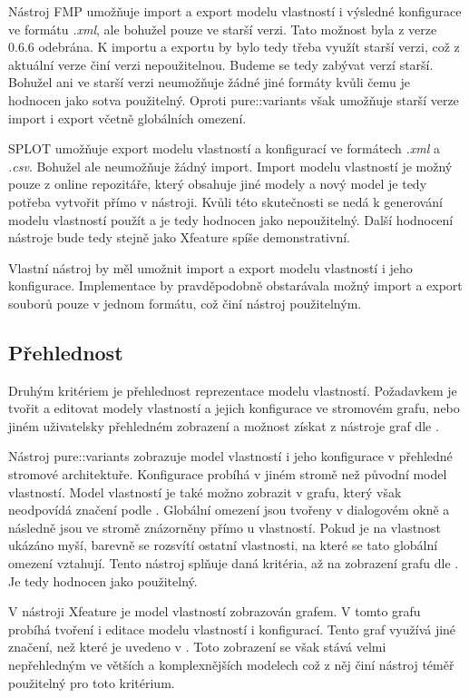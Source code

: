 Nástroj FMP umožňuje import a export modelu vlastností i výsledné konfigurace ve formátu \textit{.xml}, ale bohužel pouze ve starší verzi. Tato možnost byla z verze 0.6.6 odebrána. K importu a exportu by bylo tedy třeba využít starší verzi, což z aktuální verze činí verzi nepoužitelnou. Budeme se tedy zabývat verzí starší. Bohužel ani ve starší verzi neumožňuje žádné jiné formáty kvůli čemu je hodnocen jako sotva použitelný. Oproti pure::variants však umožňuje starší verze import i export včetně globálních omezení. 

SPLOT umožňuje export modelu vlastností a konfigurací ve formátech \textit{.xml} a \textit{.csv}. Bohužel ale neumožňuje žádný import. Import modelu vlastností je možný pouze z online repozitáře, který obsahuje jiné modely a nový model je tedy potřeba vytvořit přímo v nástroji. Kvůli této skutečnosti se nedá k generování modelu vlastností použít a je tedy hodnocen jako nepoužitelný. Další hodnocení nástroje bude tedy stejně jako Xfeature spíše demonstrativní.

Vlastní nástroj by měl umožnit import a export modelu vlastností i jeho konfigurace. Implementace by pravděpodobně obstarávala možný import a export souborů pouze v jednom formátu, což činí nástroj použitelným.

\subsection{Přehlednost}
Druhým kritériem je přehlednost reprezentace modelu vlastností. Požadavkem je tvořit a editovat modely vlastností a jejich konfigurace ve stromovém grafu, nebo jiném uživatelsky přehledném zobrazení a možnost získat z nástroje graf dle \cite{Czarnecki98}.

Nástroj pure::variants zobrazuje model vlastností i jeho konfigurace v přehledné stromové architektuře. Konfigurace probíhá v jiném stromě než původní model vlastností. Model vlastností je také možno zobrazit v grafu, který však neodpovídá značení podle \cite{Czarnecki98}. Globální omezení jsou tvořeny v dialogovém okně a následně jsou ve stromě znázorněny přímo u vlastností. Pokud je na vlastnost ukázáno myší, barevně se rozsvítí ostatní vlastnosti, na které se tato globální omezení vztahují. Tento nástroj splňuje daná kritéria, až na zobrazení grafu dle \cite{Czarnecki98}. Je tedy hodnocen jako použitelný.

V nástroji Xfeature je model vlastností zobrazován grafem. V tomto grafu probíhá tvoření i editace modelu vlastností i konfigurací. Tento graf využívá jiné značení, než které je uvedeno v \cite{Czarnecki98}. Toto zobrazení se však stává velmi nepřehledným ve větších a komplexnějších modelech což z něj činí nástroj téměř použitelný pro toto kritérium.

